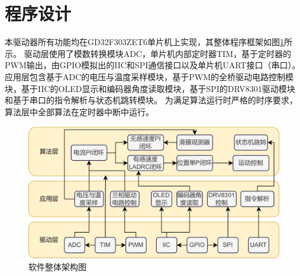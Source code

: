 ﻿\documentclass[12pt,a4paper]{article}
\begin{document}
\section{程序设计}
本驱动器所有功能均在GD32F303ZET6单片机上实现，其整体程序框架如图\ref{software1}所示。
驱动层使用了模数转换模块ADC，单片机内部定时器TIM，基于定时器的PWM输出，由GPIO模拟出的IIC和SPI通信接口以及单片机UART接口（串口）。
应用层包含基于ADC的电压与温度采样模块，基于PWM的全桥驱动电路控制模块，基于IIC的OLED显示和编码器角度读取模块，基于SPI的DRV8301驱动模块和基于串口的指令解析与状态机跳转模块。
为满足算法运行时严格的时序要求，算法层中全部算法在定时器中断中运行。
\begin{figure}[!h]
  \centering
  \includegraphics[width=\textwidth]{./picture/软件架构图.drawio.png}
  \caption{软件整体架构图}
  \label{software1}
\end{figure}
\end{document}
